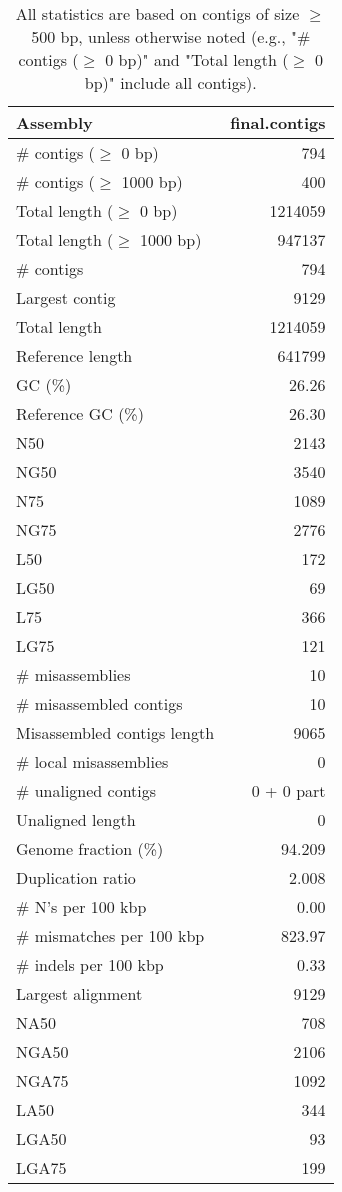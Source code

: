 \documentclass[12pt,a4paper]{article}
\begin{document}
\begin{table}[ht]
\begin{center}
\caption{All statistics are based on contigs of size $\geq$ 500 bp, unless otherwise noted (e.g., "\# contigs ($\geq$ 0 bp)" and "Total length ($\geq$ 0 bp)" include all contigs).}
\begin{tabular}{|l*{1}{|r}|}
\hline
Assembly & final.contigs \\ \hline
\# contigs ($\geq$ 0 bp) & 794 \\ \hline
\# contigs ($\geq$ 1000 bp) & 400 \\ \hline
Total length ($\geq$ 0 bp) & 1214059 \\ \hline
Total length ($\geq$ 1000 bp) & 947137 \\ \hline
\# contigs & 794 \\ \hline
Largest contig & 9129 \\ \hline
Total length & 1214059 \\ \hline
Reference length & 641799 \\ \hline
GC (\%) & 26.26 \\ \hline
Reference GC (\%) & 26.30 \\ \hline
N50 & 2143 \\ \hline
NG50 & 3540 \\ \hline
N75 & 1089 \\ \hline
NG75 & 2776 \\ \hline
L50 & 172 \\ \hline
LG50 & 69 \\ \hline
L75 & 366 \\ \hline
LG75 & 121 \\ \hline
\# misassemblies & 10 \\ \hline
\# misassembled contigs & 10 \\ \hline
Misassembled contigs length & 9065 \\ \hline
\# local misassemblies & 0 \\ \hline
\# unaligned contigs & 0 + 0 part \\ \hline
Unaligned length & 0 \\ \hline
Genome fraction (\%) & 94.209 \\ \hline
Duplication ratio & 2.008 \\ \hline
\# N's per 100 kbp & 0.00 \\ \hline
\# mismatches per 100 kbp & 823.97 \\ \hline
\# indels per 100 kbp & 0.33 \\ \hline
Largest alignment & 9129 \\ \hline
NA50 & 708 \\ \hline
NGA50 & 2106 \\ \hline
NGA75 & 1092 \\ \hline
LA50 & 344 \\ \hline
LGA50 & 93 \\ \hline
LGA75 & 199 \\ \hline
\end{tabular}
\end{center}
\end{table}
\end{document}
